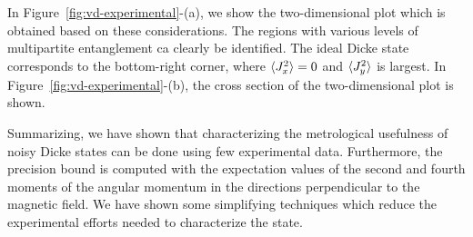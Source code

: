 In Figure~\ref{fig:vd-experimental}-(a), we show the two-dimensional plot which is obtained based on these considerations.
The regions with various levels of multipartite entanglement ca clearly be identified.
The ideal Dicke state corresponds to the bottom-right corner, where $\langle{J_x^2}\rangle=0$ and $\langle{J_y^2}\rangle$ is largest.
In Figure~\ref{fig:vd-experimental}-(b), the cross section of the two-dimensional plot is shown.

Summarizing, we have shown that characterizing the metrological usefulness of noisy Dicke states can be done using few experimental data.
Furthermore, the precision bound is computed with the expectation values of the second and fourth moments of the angular momentum in the directions perpendicular to the magnetic field.
We have shown some simplifying techniques which reduce the experimental efforts needed to characterize the state.
